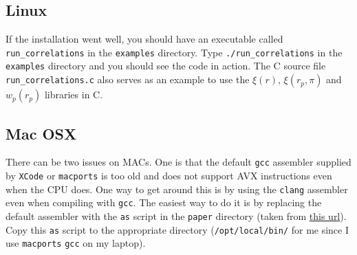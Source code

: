 \documentclass[12pt,titlepage,justified]{article}
\newcommand{\xir}{\ensuremath{{\xi(r)}}\xspace}
\newcommand{\wprp}{\ensuremath{{w_p(r_p)}}\xspace}
\newcommand{\xirppi}{\ensuremath{{\xi(r_p,\pi)}}\xspace}
\newcommand{\clang}{{\texttt{clang}}\xspace}
\newcommand{\gcc}{{\texttt{gcc}}\xspace}
\begin{document}
\subsection{Linux}
If the installation went well, you should have an executable called \texttt{run\_correlations} in the \texttt{examples} directory. Type \texttt{./run\_correlations} 
in the \texttt{examples} directory and you should see the code in action. The C source file \texttt{run\_correlations.c} also serves as an example to 
use the \xir, \xirppi and \wprp libraries in C. 

\subsection{Mac OSX}\label{section:mac}
There can be two issues on MACs. One is that the default \gcc assembler supplied by \texttt{XCode} or \texttt{macports} is too old and does not support AVX instructions 
even when the CPU does. One way to get around this is by using the \clang assembler even when compiling with \gcc. The easiest way to do it is by replacing the 
default assembler with the \texttt{as} script in the \texttt{paper} directory (taken from \href{https://gist.github.com/ancapdev/8059572}{this url}). Copy this
\texttt{as} script to the appropriate directory (\texttt{/opt/local/bin/} for me since I use \texttt{macports} \gcc on my laptop).
\end{document}
